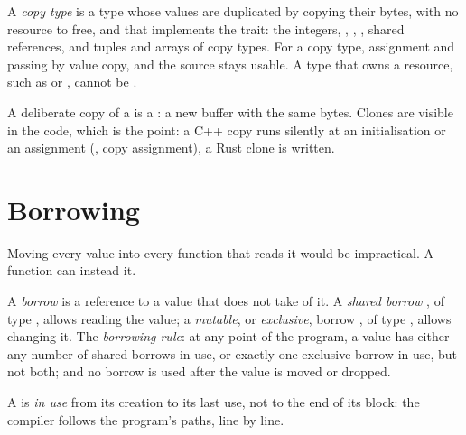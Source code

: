 \label{out:b2:rust-ownership:use-after-move}

\begin{definition}\label{def:b2:rust-ownership:copy-type}
A \emph{copy type} is a type whose values are duplicated by copying their bytes, with no
resource to free, and that implements the  trait: the integers, , , ,
shared references, and tuples and arrays of copy types. For a copy type, assignment and passing by value copy, and
the source stays usable. A type that owns a resource, such as  or , cannot be .
\end{definition}

A deliberate copy of a  is a : a new buffer with the same bytes. Clones are visible in the
code, which is the point: a C++ copy runs silently at an initialisation or an assignment (, copy assignment), a Rust clone
is written.

\section{Borrowing}\label{sec:b2:rust-ownership:borrowing}

Moving every value into every function that reads it would be impractical. A function can instead
\emph{} it.

\begin{definition}[Borrow]\label{def:b2:rust-ownership:borrow}
A \emph{borrow} is a reference to a value that does not take  of it. A \emph{shared
borrow} , of type , allows reading the value; a \emph{mutable}, or \emph{exclusive}, borrow
, of type , allows changing it. The \emph{borrowing rule}: at any point of the program, a
value has either any number of shared borrows in use, or exactly one exclusive borrow in use, but not both; and no
borrow is used after the value is moved or dropped.
\end{definition}

A  is \emph{in use} from its creation to its last use, not to the end of its block: the compiler follows the
program's paths, line by line.

